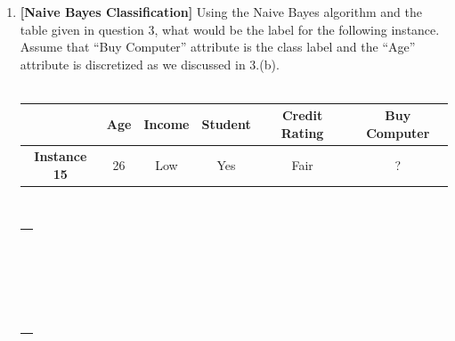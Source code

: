 \documentclass[11pt]{article}
\begin{document}
\begin{enumerate}
\newpage
    \item \textbf{[Naive Bayes Classification]} 
    Using the Naive Bayes algorithm and the table given in question 3, what would be the label for the following instance.  Assume that “Buy Computer” attribute is the class label and the “Age” attribute is discretized as we discussed in 3.(b).\\\\
    \begin{tabular}{ |c|c| c| c| c|c| } 
            \hline
            & \bf Age & \bf Income & \bf Student & \bf Credit Rating & \bf Buy Computer\\ [0.5ex] 
            \hline
            \bf Instance 15 & 26 & Low & Yes & Fair & ? \\
            \hline
        \end{tabular}\vspace{1cm}\\
        \begin{tabular}{ | m{15cm} | } 
     \hline
     \\ \\ \\ \\ \\ \\ \\  \\ \\ \\  \\ \\ \\  \\ \\ \\  \\ \\ \\  \\ \\ \\
     \hline
    \end{tabular}
\end{enumerate}
\newpage
\end{document}
